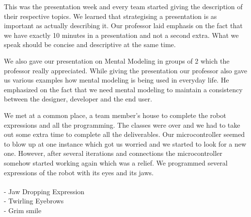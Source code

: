 \documentclass[index=totoc,hyperref,openany]{labbook} %
\begin{document}
This was the presentation week and every team started giving the description of their respective topics. We learned that strategising a presentation is as important as actually describing it. Our professor laid emphasis on the fact that we have exactly 10 minutes in a presentation and not a second extra. What we speak should be concise and descriptive at the same time.
\par We also gave our presentation on Mental Modeling in groups of 2 which the professor really appreciated. While giving the presentation our professor also gave us various examples how mental modeling is being used in everyday life. He emphasized on the fact that we need mental modeling to maintain a consistency between the designer, developer and the end user.


{\let\clearpage\relax {}}

We met at a common place, a team member's house to complete the robot expressions and all the programming. The classes were over and we had to take out some extra time to complete all the deliverables. Our microcontroller seemed to blow up at one instance which got us worried and we started to look for a new one. However, after several iterations and connections the microcontroller somehow started working again which was a relief. We programmed several expressions of the robot with its eyes and its jaws.\\ \\
- Jaw Dropping Expression\\
- Twirling Eyebrows\\
- Grim smile\\

\end{document}
